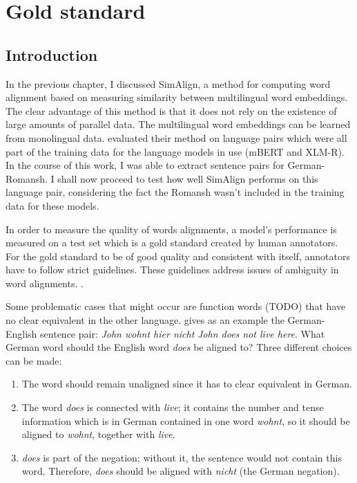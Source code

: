 \chapter{Gold standard}
\label{chap:gold-standard}
\section{Introduction}
In the previous chapter, I discussed SimAlign, a method for computing word alignment based on measuring similarity between multilingual word embeddings. 
The clear advantage of this method is that it does not rely on the existence of large amounts of parallel data. 
The multilingual word embeddings can be learned from monolingual data. 
\cite{jalili-sabet-etal-2020-simalign} evaluated their method on language pairs which were all part of the training data for the language models in use (mBERT and XLM-R). 
In the course of this work, I was able to extract  sentence pairs for German-Romansh. 
I shall now proceed to test how well SimAlign performs on this language pair, considering the fact the Romansh wasn't included in the training data for these models. 


In order to measure the quality of words alignments, a model's performance is measured on a test set which is a gold standard created by human annotators. 
For the gold standard to be of good quality and consistent with itself, annotators have to follow strict guidelines.
These guidelines address issues of ambiguity in word alignments. \autocite[115]{koehn2009}. 

Some problematic cases that might occur are function words (TODO) that have no clear equivalent in the other language. 
\cite{koehn2009} gives as an example the German-English sentence pair: \emph{John wohnt hier nicht}  \emph{John does not live here}. 
What German word should the English word \emph{does} be aligned to? 
Three different choices can be made:
\begin{enumerate}
	\item The word should remain unaligned since it has to clear equivalent in German.
	\item The word \emph{does} is connected with \emph{live}; it contains the number and tense information which is in German contained in one word \emph{wohnt}, so it should be aligned to \emph{wohnt}, together with \emph{live}.
	\item \emph{does} is part of the negation; without it, the sentence would not contain this word. Therefore, \emph{does} should be aligned with \emph{nicht} (the German negation).
\end{enumerate}

